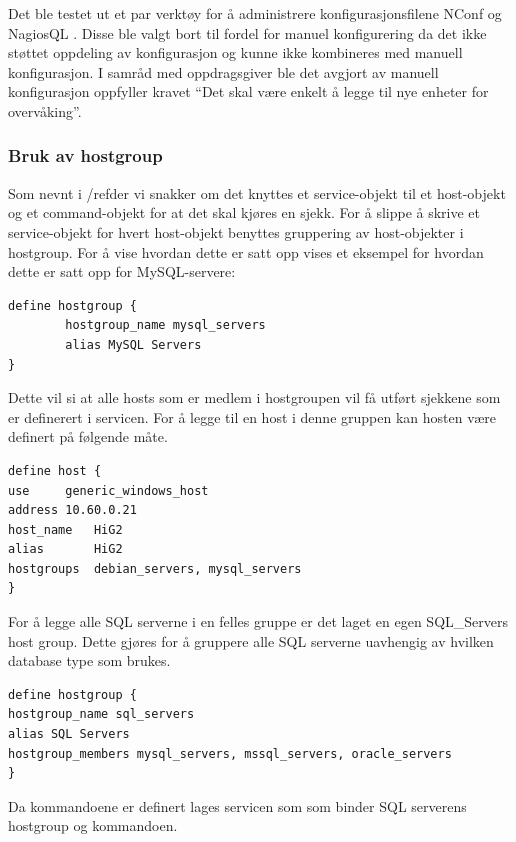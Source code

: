 
Det ble testet ut et par verktøy for å administrere konfigurasjonsfilene NConf \cite{nconf} og NagiosQL \cite{nagiosql}. Disse ble valgt bort til fordel for manuel konfigurering da det ikke støttet oppdeling av konfigurasjon og kunne ikke kombineres med manuell konfigurasjon. I samråd med oppdragsgiver ble det avgjort av manuell konfigurasjon oppfyller kravet “Det skal være enkelt å legge til nye enheter for overvåking”.



\subsubsection{Bruk av hostgroup}
Som nevnt i /ref{der vi snakker om det} knyttes et service-objekt til et host-objekt og et command-objekt for at det skal kjøres en sjekk. For å slippe å skrive et service-objekt for hvert host-objekt benyttes gruppering av host-objekter i hostgroup. For å vise hvordan dette er satt opp vises et eksempel for hvordan dette er satt opp for MySQL-servere:

\begin{lstlisting}
define hostgroup {
        hostgroup_name mysql_servers
        alias MySQL Servers
}
\end{lstlisting}
Dette vil si at alle hosts som er medlem i hostgroupen vil få utført sjekkene som er definerert i servicen. For å legge til en host i denne gruppen kan hosten være definert på følgende måte.

\begin{lstlisting}
define host {
use		generic_windows_host
address	10.60.0.21
host_name	HiG2
alias		HiG2
hostgroups	debian_servers, mysql_servers
}
\end{lstlisting}
For å legge alle SQL serverne i en felles gruppe er det laget en egen SQL\_Servers host group. Dette gjøres for å gruppere alle SQL serverne uavhengig av hvilken database type som brukes. 

\begin{lstlisting}
define hostgroup {
hostgroup_name sql_servers
alias SQL Servers
hostgroup_members mysql_servers, mssql_servers, oracle_servers
}
\end{lstlisting}
Da kommandoene er definert lages servicen som som binder SQL serverens hostgroup og kommandoen.

